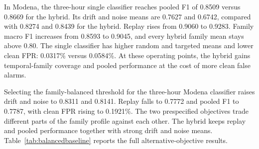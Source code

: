In Modena, the three-hour single classifier reaches pooled F1 of 0.8509 versus 0.8669 for the hybrid. Its drift and noise means are 0.7627 and 0.6742, compared with 0.8274 and 0.8439 for the hybrid. Replay rises from 0.9060 to 0.9283. Family macro F1 increases from 0.8593 to 0.9045, and every hybrid family mean stays above 0.80. The single classifier has higher random and targeted means and lower clean FPR: 0.0317\% versus 0.0584\%. At these operating points, the hybrid gains temporal-family coverage and pooled performance at the cost of more clean false alarms.

Selecting the family-balanced threshold for the three-hour Modena classifier raises drift and noise to 0.8311 and 0.8141. Replay falls to 0.7772 and pooled F1 to 0.7787, with clean FPR rising to 0.1921\%. The two prespecified objectives trade different parts of the family profile against each other. The hybrid keeps replay and pooled performance together with strong drift and noise means. Table~\ref{tab:balancedbaseline} reports the full alternative-objective results.
